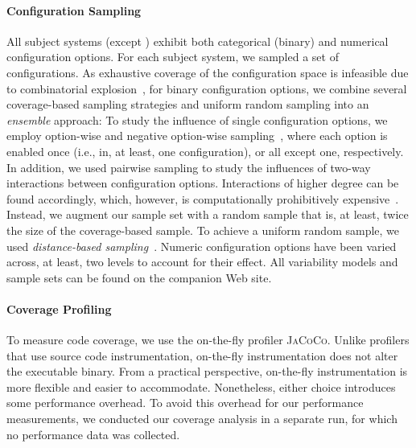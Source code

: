 \paragraph{Configuration Sampling}\label{sec:sampling}
All subject systems (except \htwo) exhibit both categorical (binary) and numerical configuration options. 
For each subject system, we sampled a set of configurations. As exhaustive coverage of the configuration space is infeasible due to combinatorial explosion~\cite{henardCombining2015}, for binary configuration options, we combine several coverage-based sampling strategies and uniform random sampling into an \emph{ensemble} approach: 
To study the influence of single configuration options, we employ option-wise and negative option-wise sampling~\cite{siegmundPerformanceinfluenceModelsHighly2015}, where each option is enabled once (i.e., in, at least, one configuration), or all except one, respectively. In addition, we used pairwise sampling to study the influences of two-way interactions between configuration options. Interactions of higher degree can be found accordingly, which, however, is computationally prohibitively expensive~\cite{henardCombining2015}. Instead, we augment our sample set with a random sample that is, at least, twice the size of the coverage-based sample. To achieve a uniform random sample, we used \emph{distance-based sampling}~\cite{kaltenecker_distance-based_2019}. Numeric configuration options have been varied across, at least, two levels to account for their effect. All variability models and sample sets can be found on the companion Web site.
	
\paragraph{Coverage Profiling}\label{sec:profiling}
To measure code coverage, we use the on-the-fly profiler \textsc{JaCoCo}. Unlike profilers that use source code instrumentation, on-the-fly instrumentation does not alter the executable binary. From a practical perspective, on-the-fly instrumentation is more flexible and easier to accommodate. Nonetheless, either choice introduces some performance overhead. To avoid this overhead for our performance measurements, we conducted our coverage analysis in a separate run, for which no performance data was collected. 	
	
